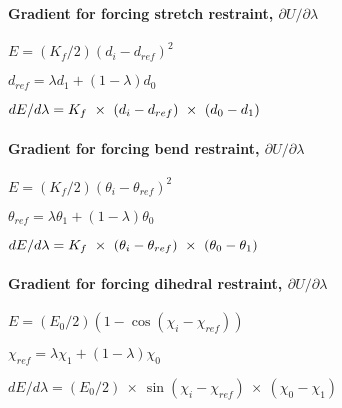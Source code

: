 \paragraph*{Gradient for forcing stretch restraint, $\partial U/\partial \lambda $}

$E=\left( K_{f}/2\right) \left( d_{i}-d_{ref}\right) ^{2}$

$d_{ref}=\lambda d_{1}+\left( 1-\lambda \right) d_{0}$

$dE/d\lambda =K_{f}~\times ~\left( d_{i}-d_{ref}\right) ~\times ~\left(
d_{0}-d_{1}\right) \bigskip $

\paragraph*{Gradient for forcing bend restraint, $\partial U/\partial \lambda $}

$E=\left( K_{f}/2\right) \left( \theta _{i}-\theta _{ref}\right) ^{2}$

$\theta _{ref}=\lambda \theta _{1}+\left( 1-\lambda \right) \theta _{0}$

$dE/d\lambda =K_{f}~\times ~\left( \theta _{i}-\theta _{ref}\right) ~\times %
~\left( \theta _{0}-\theta _{1}\right) \bigskip $

\paragraph*{Gradient for forcing dihedral restraint, $\partial U/\partial \lambda $}

$E=\left( E_{0}/2\right) \left( 1-\cos \left( \chi _{i}-\chi _{ref}\right)
\right) $

$\chi _{ref}=\lambda \chi _{1}+\left( 1-\lambda \right) \chi _{0}$

$dE/d\lambda =\left( E_{0}/2\right) ~\times ~\sin \left( \chi _{i}-\chi
_{ref}\right) ~\times ~\left( \chi _{0}-\chi _{1}\right) $


